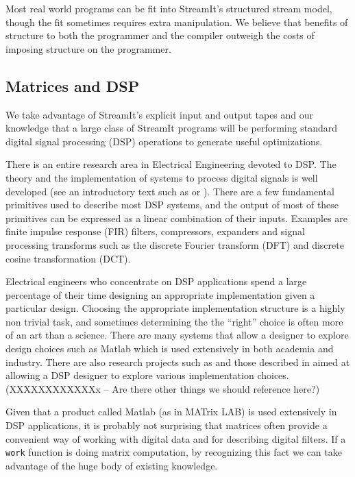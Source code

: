 Most real world programs can be fit into StreamIt's structured stream model, 
though the fit sometimes requires extra manipulation. We believe
that benefits of structure to both the programmer and the compiler outweigh the
costs of imposing structure on the programmer.

\subsection{Matrices and DSP}
We take advantage of StreamIt's explicit input and output tapes and
our knowledge that a large class of StreamIt programs will be performing
standard digital signal processing (DSP) operations to generate useful
optimizations.

There is an entire research area in Electrical Engineering devoted to DSP. The
theory and the implementation of systems to process digital signals is well developed (see
an introductory text such as\cite{oppenheim-discrete} or \cite{lyons-understanding}). 
There are a few fundamental primitives used to describe most DSP systems, and the output of 
most of these primitives can be expressed as a linear combination of their inputs. Examples are
finite impulse response (FIR) filters, compressors, expanders and signal processing transforms
such as the discrete Fourier transform (DFT) and discrete cosine transformation (DCT).

Electrical engineers who concentrate on DSP applications spend a large percentage of their 
time designing an appropriate implementation given a particular design. Choosing
the appropriate implementation structure is a highly non trivial task, and sometimes determining the 
the ``right'' choice is often more of an art than a science. There are many systems that allow a
designer to explore design choices such as Matlab\cite{matlab} which is used extensively in
both academia and industry.  There are also research projects such as \cite{covell-ade} 
and those described in \cite{oppenheim-symbolic} aimed at allowing a DSP designer to explore
various implementation choices.(XXXXXXXXXXXXx -- Are there other things we should reference here?) 

Given that a product called Matlab (as in  MATrix LAB) is used extensively
in DSP applications, it is probably not surprising that matrices often provide 
a convenient way of working with digital data and for describing digital filters. 
If a {\tt work} function is doing matrix computation, by recognizing this fact
we can take advantage of the huge body of existing knowledge.
